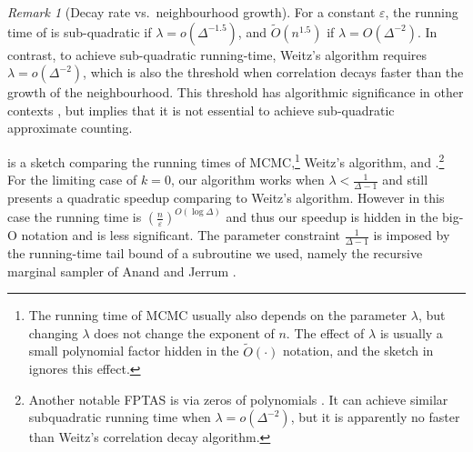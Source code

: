 \documentclass[11pt]{amsart}
\newcommand{\eps}{\varepsilon}
\theoremstyle{definition}
\theoremstyle{remark}
\newtheorem*{remark}{Remark}
\begin{document}
\begin{remark}[Decay rate vs.~neighbourhood growth]
For a constant $\eps$,
the running time of  is sub-quadratic if $\lambda=o(\Delta^{-1.5})$,
and $\widetilde{O}(n^{1.5})$ if $\lambda=O(\Delta^{-2})$. 
In contrast, to achieve sub-quadratic running-time, Weitz's algorithm requires $\lambda=o(\Delta^{-2})$,
which is also the threshold when correlation decays faster than the growth of the neighbourhood.
This threshold has algorithmic significance in other contexts \cite{FGY22,AJ22},
but  implies that it is not essential to achieve sub-quadratic approximate counting.
\end{remark}

 is a sketch comparing the running times of MCMC,\footnote{The running time of MCMC usually also depends on the parameter $\lambda$, but changing $\lambda$ does not change the exponent of $n$. The effect of $\lambda$ is usually a small polynomial factor hidden in the $\widetilde{O}(\cdot)$ notation, and the sketch in  ignores this effect.} Weitz's algorithm, and .\footnote{Another notable FPTAS is via zeros of polynomials \cite{Bar16,PR17}. It can achieve similar subquadratic running time when $\lambda=o(\Delta^{-2})$, but it is apparently no faster than Weitz's correlation decay algorithm.}
For the limiting case of $k=0$, our algorithm works when $\lambda<\frac{1}{\Delta-1}$ and still presents a quadratic speedup comparing to Weitz's algorithm.
However in this case the running time is $\left( \frac{n}{\eps} \right)^{O(\log \Delta)}$ and thus our speedup is hidden in the big-O notation and is less significant.
The parameter constraint $\frac{1}{\Delta-1}$ is imposed by the running-time tail bound of a subroutine we used, namely the recursive marginal sampler of Anand and Jerrum \cite{AJ22}.
\end{document}
